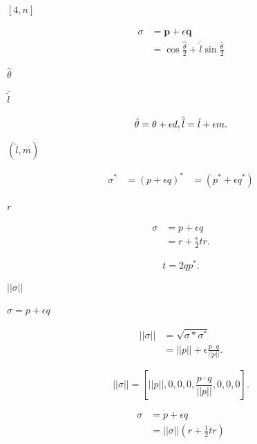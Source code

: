\documentclass{article}
\begin{document}
$[4,n]$
\pagebreak

\[\begin{equation}
\begin{split}
\sigma &=\boldsymbol{p} + \epsilon \boldsymbol{q}\\
&= \cos\hat{\frac{\theta}{2}}+\overline{\hat{l}}\sin\frac{\hat{\theta}}{2}
\end{split}
\end{equation}
\]
\pagebreak

$\hat{\theta}$
\pagebreak

$\overline{\hat{l}}$
\pagebreak

\[\hat{\theta}=\theta + \epsilon d,\\
\overline{\hat{l}}= \hat{l} +\epsilon m.
\]
\pagebreak

$(\hat{l},m)$
\pagebreak

\[\begin{equation}
\begin{split}
\sigma^* &= (p + \epsilon q)^*
         &= (p^* + \epsilon q^*)
\end{split}
\end{equation}
\]
\pagebreak

$r$
\pagebreak

\[\begin{equation}
\begin{split}
\sigma &= p + \epsilon q \\
       &= r + \frac{\epsilon}{2}{t}r.
\end{split}
\end{equation}\]
\pagebreak

\[t = 2qp^*.\]
\pagebreak

$||\sigma||$
\pagebreak

$\sigma = p + \epsilon q$
\pagebreak

\[ \begin{equation}
 \begin{split}
 ||\sigma|| &= \sqrt{\sigma * \sigma^*} \\
       &= ||p|| + \epsilon \frac{p \cdot q}{||p||}.
 \end{split}
 \end{equation}
\]
\pagebreak

\[ ||\sigma|| = [||p||, 0, 0, 0, \frac{p \cdot q}{||p||}, 0, 0, 0].\]
\pagebreak

\[\begin{equation}
\begin{split}
\sigma &= p + \epsilon q\\
&=||\sigma||\left(r+\frac{1}{2}tr\right)
\end{split}
\end{equation}
\]
\pagebreak
\end{document}
